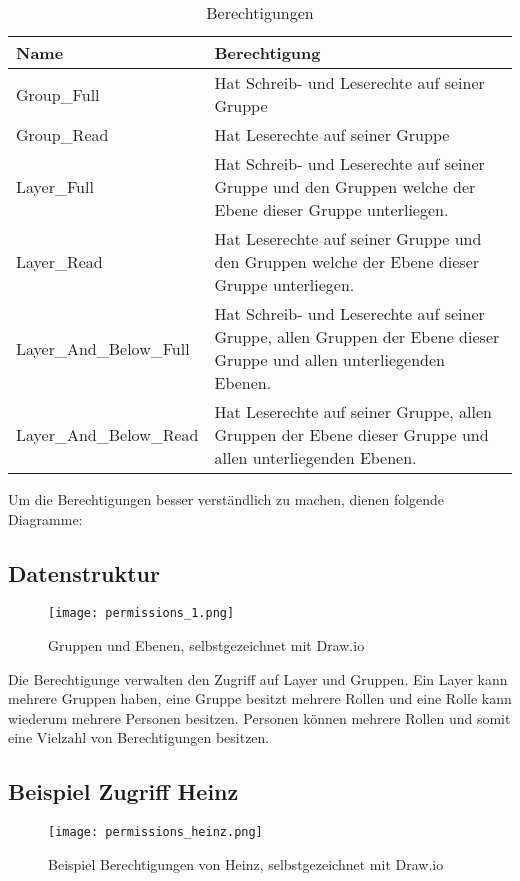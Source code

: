 \begin{table}[h!]
  \begin{tabular}{|L{0.3\textwidth}|L{0.8\textwidth}|}
      \color{white} Name & \color{white} Berechtigung \\ [12pt]
      \hline
      Group\_Full & Hat Schreib- und Leserechte auf seiner Gruppe \\
      \hline
      Group\_Read & Hat Leserechte auf seiner Gruppe  \\
      \hline
      Layer\_Full & Hat Schreib- und Leserechte auf seiner Gruppe und den Gruppen welche der Ebene dieser Gruppe unterliegen. \\
      \hline
      Layer\_Read & Hat Leserechte auf seiner Gruppe und den Gruppen welche der Ebene dieser Gruppe unterliegen. \\
      \hline
      Layer\_And\_Below\_Full & Hat Schreib- und Leserechte auf seiner Gruppe, allen Gruppen der Ebene dieser Gruppe und allen unterliegenden Ebenen. \\
      \hline
      Layer\_And\_Below\_Read & Hat Leserechte auf seiner Gruppe, allen Gruppen der Ebene dieser Gruppe und allen unterliegenden Ebenen. \\
      \hline
    \end{tabular}
    \caption{Berechtigungen}
\end{table}

\newpage

Um die Berechtigungen besser verständlich zu machen, dienen folgende Diagramme:


\subsection{Datenstruktur}
\begin{figure}[h]
  \centering
  \texttt{[image: permissions\_1.png]}
  \caption{Gruppen und Ebenen, selbstgezeichnet mit Draw.io}
\end{figure}

Die Berechtigunge verwalten den Zugriff auf Layer und Gruppen. Ein Layer kann mehrere Gruppen haben,
eine Gruppe besitzt mehrere Rollen und eine Rolle kann wiederum mehrere Personen besitzen. Personen können
mehrere Rollen und somit eine Vielzahl von Berechtigungen besitzen.

\newpage

\subsection{Beispiel Zugriff Heinz}
\begin{figure}[h]
  \centering
  \texttt{[image: permissions\_heinz.png]}
  \caption{Beispiel Berechtigungen von Heinz, selbstgezeichnet mit Draw.io}
\end{figure}


